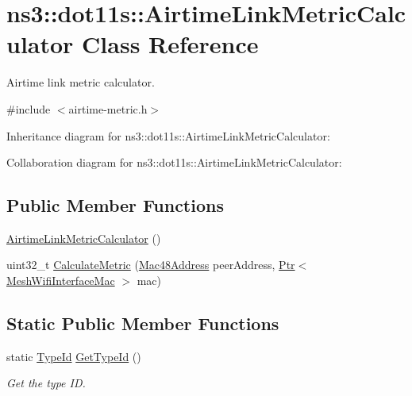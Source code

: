 \hypertarget{classns3_1_1dot11s_1_1AirtimeLinkMetricCalculator}{}\section{ns3\+:\+:dot11s\+:\+:Airtime\+Link\+Metric\+Calculator Class Reference}
\label{classns3_1_1dot11s_1_1AirtimeLinkMetricCalculator}


Airtime link metric calculator.  




{\ttfamily \#include $<$airtime-\/metric.\+h$>$}



Inheritance diagram for ns3\+:\+:dot11s\+:\+:Airtime\+Link\+Metric\+Calculator\+:


Collaboration diagram for ns3\+:\+:dot11s\+:\+:Airtime\+Link\+Metric\+Calculator\+:
\subsection*{Public Member Functions}
\begin{DoxyCompactItemize}
\item 
\hyperlink{classns3_1_1dot11s_1_1AirtimeLinkMetricCalculator_ab3d660bd793115799e83e1296ecbed47}{Airtime\+Link\+Metric\+Calculator} ()
\item 
uint32\+\_\+t \hyperlink{classns3_1_1dot11s_1_1AirtimeLinkMetricCalculator_a72c6cb74bc18c3d3faf86a1da79c9afd}{Calculate\+Metric} (\hyperlink{classns3_1_1Mac48Address}{Mac48\+Address} peer\+Address, \hyperlink{classns3_1_1Ptr}{Ptr}$<$ \hyperlink{classns3_1_1MeshWifiInterfaceMac}{Mesh\+Wifi\+Interface\+Mac} $>$ mac)
\end{DoxyCompactItemize}
\subsection*{Static Public Member Functions}
\begin{DoxyCompactItemize}
\item 
static \hyperlink{classns3_1_1TypeId}{Type\+Id} \hyperlink{classns3_1_1dot11s_1_1AirtimeLinkMetricCalculator_af622528b17c03be70643f061a7e8293c}{Get\+Type\+Id} ()
\begin{DoxyCompactList}\small\item\em Get the type ID. \end{DoxyCompactList}\end{DoxyCompactItemize}
